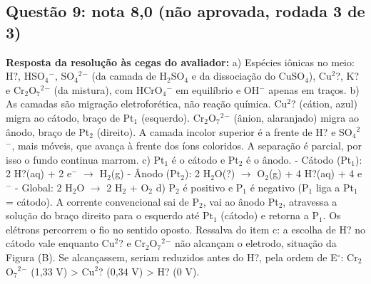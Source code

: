 \documentclass{article}%
\begin{document}
\subsection*{Questão 9: nota 8,0 (não aprovada, rodada 3 de 3)}%
\textbf{Resposta da resolução às cegas do avaliador:} a) Espécies iônicas no meio: H?, HSO$_{4}$$^{-}$, SO$_{4}$$^2$$^{-}$ (da camada de H$_{2}$SO$_{4}$ e da dissociação do CuSO$_{4}$), Cu$^2$?, K? e Cr$_{2}$O$_{7}$$^2$$^{-}$ (da mistura), com HCrO$_{4}$$^{-}$ em equilíbrio e OH$^{-}$ apenas em traços.\newline%
\newline%
b) As camadas são migração eletroforética, não reação química. Cu$^2$? (cátion, azul) migra ao cátodo, braço de Pt$_{1}$ (esquerdo). Cr$_{2}$O$_{7}$$^2$$^{-}$ (ânion, alaranjado) migra ao ânodo, braço de Pt$_{2}$ (direito). A camada incolor superior é a frente de H? e SO$_{4}$$^2$$^{-}$, mais móveis, que avança à frente dos íons coloridos. A separação é parcial, por isso o fundo continua marrom.\newline%
\newline%
c) Pt$_{1}$ é o cátodo e Pt$_{2}$ é o ânodo.\newline%
{-} Cátodo (Pt$_{1}$): 2 H?(aq) + 2 e$^{-}$ $\to$ H$_{2}$(g)\newline%
{-} Ânodo (Pt$_{2}$): 2 H$_{2}$O(?) $\to$ O$_{2}$(g) + 4 H?(aq) + 4 e$^{-}$\newline%
{-} Global: 2 H$_{2}$O $\to$ 2 H$_{2}$ + O$_{2}$\newline%
\newline%
d) P$_{2}$ é positivo e P$_{1}$ é negativo (P$_{1}$ liga a Pt$_{1}$ = cátodo). A corrente convencional sai de P$_{2}$, vai ao ânodo Pt$_{2}$, atravessa a solução do braço direito para o esquerdo até Pt$_{1}$ (cátodo) e retorna a P$_{1}$. Os elétrons percorrem o fio no sentido oposto.\newline%
\newline%
Ressalva do item c: a escolha de H? no cátodo vale enquanto Cu$^2$? e Cr$_{2}$O$_{7}$$^2$$^{-}$ não alcançam o eletrodo, situação da Figura (B). Se alcançassem, seriam reduzidos antes do H?, pela ordem de E$^\circ$: Cr$_{2}$O$_{7}$$^2$$^{-}$ (1,33 V) > Cu$^2$? (0,34 V) > H? (0 V).\par %
\end{document}
